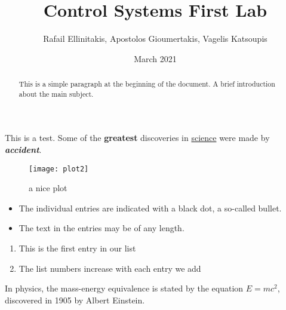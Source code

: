 \documentclass[12pt, a4paper]{report}  %
\title{Control Systems First Lab}
\author{Rafail Ellinitakis, Apostolos Gioumertakis, Vagelis Katsoupis}
\date{March 2021}
\begin{document}
\maketitle  %


\begin{abstract}
This is a simple paragraph at the beginning of the 
document. A brief introduction about the main subject.
\end{abstract}


This is a test.
Some of the \textbf{greatest}
discoveries in \underline{science} 
were made by \textbf{\textit{accident}}.


\begin{figure}[h]  %
    \centering
    \texttt{[image: plot2]}
    \caption{a nice plot}
    \label{fig:mesh1}
\end{figure}



\begin{itemize}
  \item The individual entries are indicated with a black dot, a so-called bullet.
  \item The text in the entries may be of any length.
\end{itemize}

\begin{enumerate}
  \item This is the first entry in our list
  \item The list numbers increase with each entry we add
\end{enumerate}

In physics, the mass-energy equivalence is stated 
by the equation $E=mc^2$, discovered in 1905 by Albert Einstein.  %
\end{document}
